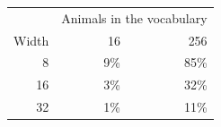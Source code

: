 \begin{tabular}{@{}rrr@{}}
\toprule
 & \multicolumn{2}{c}{Animals in the vocabulary} \\
Width & 16 & 256 \\
\midrule
8 & 9\% & 85\% \\
16 & 3\% & 32\% \\
32 & 1\% & 11\% \\
\bottomrule
\end{tabular}
